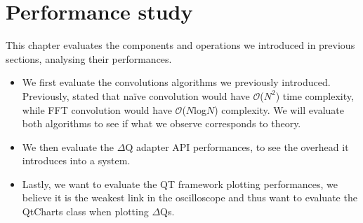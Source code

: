 \chapter{Performance study}
    This chapter evaluates the components and operations we introduced in previous sections, analysing their performances.
    \begin{itemize}
        \item We first evaluate the convolutions algorithms we previously introduced. Previously, stated that naïve convolution would have $\mathcal{O}$($N^2$) time complexity, while FFT convolution would have $\mathcal{O}$($N$log$N$) complexity. We will evaluate both algorithms to see if what we observe corresponds to theory.
        \item We then evaluate the $\Delta$Q adapter API performances, to see the overhead it introduces into a system.
        \item Lastly, we want to evaluate the QT framework plotting performances, we believe it is the weakest link in the oscilloscope and thus want to evaluate the QtCharts class when plotting $\Delta$Qs. 
    \end{itemize}

    
    
     
